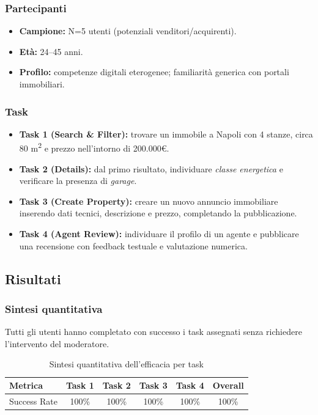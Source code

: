 \documentclass[a4paper,11pt]{report}
\begin{document}
\subsubsection*{Partecipanti}

\begin{itemize}[nosep]
  \item \textbf{Campione:} N=5 utenti (potenziali venditori/acquirenti).
  \item \textbf{Età:} 24--45 anni.
  \item \textbf{Profilo:} competenze digitali eterogenee; familiarità generica con portali immobiliari.
\end{itemize}

\subsubsection*{Task}

\begin{itemize}[nosep]
  \item \textbf{Task 1 (Search \& Filter):} trovare un immobile a Napoli con 4 stanze, circa 80 m\textsuperscript{2} e prezzo nell’intorno di 200.000€.
  \item \textbf{Task 2 (Details):} dal primo risultato, individuare \emph{classe energetica} e verificare la presenza di \emph{garage}.
  \item \textbf{Task 3 (Create Property):} creare un nuovo annuncio immobiliare inserendo dati tecnici, descrizione e prezzo, completando la pubblicazione.
  \item \textbf{Task 4 (Agent Review):} individuare il profilo di un agente e pubblicare una recensione con feedback testuale e valutazione numerica.
\end{itemize}

\subsection{Risultati}

\subsubsection*{Sintesi quantitativa}

Tutti gli utenti hanno completato con successo i task assegnati senza richiedere l'intervento del moderatore.

\begin{table}[H]
\centering
\renewcommand{\arraystretch}{1.2}
\begin{tabular}{lccccc}
\toprule
\textbf{Metrica} & \textbf{Task 1} & \textbf{Task 2} & \textbf{Task 3} & \textbf{Task 4} & \textbf{Overall} \\
\midrule
Success Rate & 100\% & 100\% & 100\% & 100\% & 100\% \\
\bottomrule
\end{tabular}
\caption{Sintesi quantitativa dell'efficacia per task}
\end{table}
\end{document}

